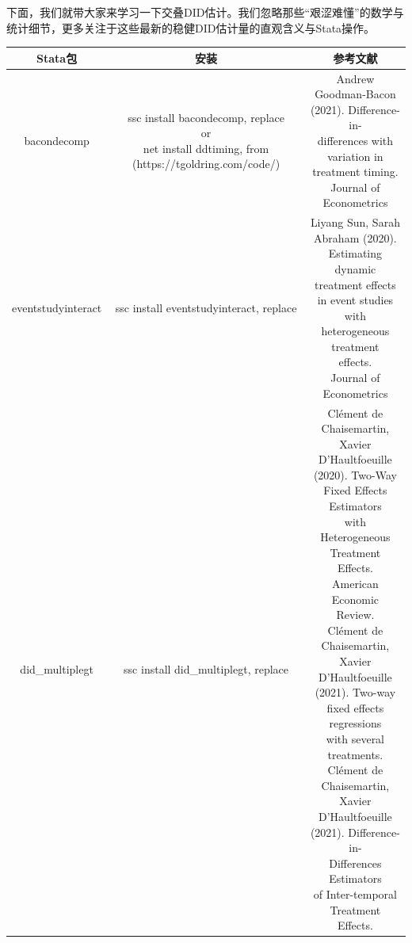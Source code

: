 \documentclass[cn,12pt,math=newtx,citestyle=gb7714-2015,bibstyle=gb7714-2015]{elegantbook}
\makeatletter
\newcommand{\tabincell}[2]{\begin{tabular}{@{}#1@{}}#2\end{tabular}}  %
\makeatother
\begin{document}
	下面，我们就带大家来学习一下交叠DID估计。我们忽略那些“艰涩难懂”的数学与统计细节，更多关注于这些最新的稳健DID估计量的直观含义与Stata操作。
	
	\begin{table}[htbp]
		\centering
		\caption{交叠DID的Stata包及对应文献}
		\begin{longtable}{|c|c|c|}
			\hline
			Stata包&安装  & 参考文献 \\
			\hline
			bacondecomp& \tabincell{c}{ ssc install bacondecomp, replace
				\\
				or
				\\
				net install ddtiming, from (https://tgoldring.com/code/)} & \tabincell{c}{ Andrew Goodman-Bacon\\(2021). Difference-in-\\differences with \\variation in \\treatment timing. \\Journal of Econometrics}\\
			\hline
			eventstudyinteract & ssc install eventstudyinteract, replace & \tabincell{c}{ Liyang Sun, Sarah \\Abraham (2020).\\ Estimating dynamic \\treatment effects\\ in event studies with\\ heterogeneous treatment \\effects. \\Journal of Econometrics}\\
			\hline
			did\_multiplegt &	ssc install did\_multiplegt, replace & \tabincell{c}{Clément de Chaisemartin,\\ Xavier D'Haultfoeuille \\(2020). Two-Way \\Fixed Effects Estimators \\with Heterogeneous \\Treatment Effects. \\American Economic \\Review.\\
				Clément de Chaisemartin, \\Xavier D'Haultfoeuille \\(2021). Two-way\\ fixed effects regressions\\ with several treatments.\\
				Clément de Chaisemartin, \\Xavier D'Haultfoeuille \\(2021). Difference-in-\\Differences Estimators \\of Inter-temporal \\Treatment Effects.} \\

\end{longtable}
\end{table}
\end{document}
